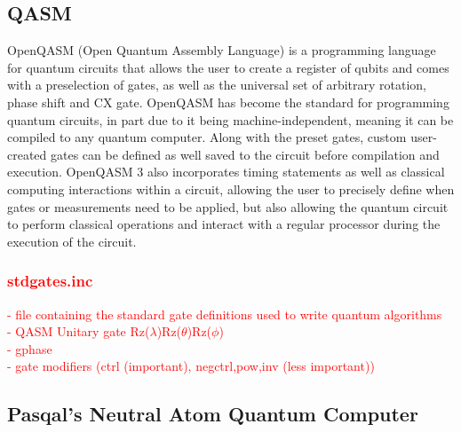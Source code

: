 \subsection{QASM}
\label{sec:Qasm}
OpenQASM (Open Quantum Assembly Language) is a programming language for quantum circuits that allows the user to create a register of qubits and comes with a preselection of gates, as well as the universal set of arbitrary rotation,
 phase shift and CX gate. OpenQASM has become the standard for programming quantum circuits, in part due to it being machine-independent, meaning it can be compiled to any
  quantum computer\cite{crossOpenQASMBroaderDeeper2022}. 
  Along with the preset gates, custom user-created gates can be defined as well saved to the circuit before compilation and execution. 
  OpenQASM 3 also incorporates timing statements as well as classical computing interactions within a circuit, allowing the user to precisely define when gates or 
  measurements need to be applied, but also allowing the quantum circuit to perform classical operations and interact with a regular processor during the execution of the circuit\cite{crossOpenQASMBroaderDeeper2022}.
  \textcolor{red}{
  \subsubsection{stdgates.inc}
- file containing the standard gate definitions used to write quantum algorithms\\
- QASM Unitary gate Rz($\lambda$)Rz($\theta$)Rz($\phi$)\\
- gphase\\
- gate modifiers (ctrl (important), negctrl,pow,inv (less important))\\}



\newpage
\subsection{Pasqal's Neutral Atom Quantum Computer}
\label{sec:NAQC}
